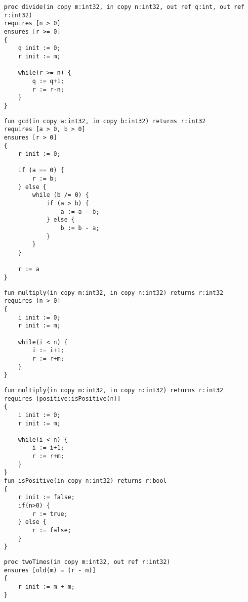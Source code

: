 
\begin{lstlisting}[caption=Beispiele von pre-/postconditions in Prozeduren]
proc divide(in copy m:int32, in copy n:int32, out ref q:int, out ref r:int32)
requires [n > 0]
ensures [r >= 0]
{
    q init := 0;
    r init := m;

    while(r >= n) {
        q := q+1;
        r := r-n;
    }
}
\end{lstlisting}

\begin{lstlisting}[caption=Beispiele von pre-/postconditions in Funktionen mit mehreren Conditions]
fun gcd(in copy a:int32, in copy b:int32) returns r:int32
requires [a > 0, b > 0]
ensures [r > 0]
{
    r init := 0;
    
    if (a == 0) {
        r := b;
    } else {
        while (b /= 0) {
            if (a > b) {
                a := a - b;
            } else {
                b := b - a;
            }
        }
    }

    r := a
}
\end{lstlisting}

\begin{lstlisting}[caption=Beispiele von pre-/postconditions in Funktionen]
fun multiply(in copy m:int32, in copy n:int32) returns r:int32
requires [n > 0]
{
    i init := 0;
    r init := m;

    while(i < n) {
        i := i+1;
        r := r+m;
    }
}
\end{lstlisting}

\begin{lstlisting}[caption=Beispiele von pre-/postconditions mit Funktion in der Condition List]
fun multiply(in copy m:int32, in copy n:int32) returns r:int32
requires [positive:isPositive(n)]
{
    i init := 0;
    r init := m;

    while(i < n) {
        i := i+1;
        r := r+m;
    }
}
fun isPositive(in copy n:int32) returns r:bool
{
    r init := false;
    if(n>0) {
        r := true;
    } else {
        r := false;
    }
}
\end{lstlisting}

\begin{lstlisting}[caption=Beispiele von pre-/postconditions mit old Fuktion]
proc twoTimes(in copy m:int32, out ref r:int32)
ensures [old(m) = (r - m)]
{
    r init := m + m;
}
\end{lstlisting}
